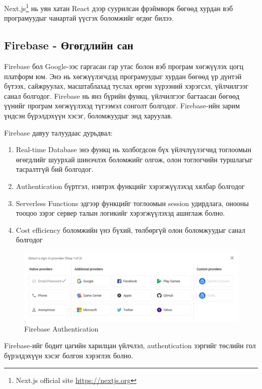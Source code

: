 Next.js\footnote{Next.js official site \url{https://nextjs.org}} нь уян хатан React дээр суурилсан фрэймворк бөгөөд хурдан вэб програмуудыг чанартай үүсгэх боломжийг өгдөг билээ. 


\subsection{Firebase - Өгөгдлийн сан}

Firebase бол Google-ээс гаргасан гар утас болон вэб програм хөгжүүлэх цогц платформ юм. Энэ нь хөгжүүлэгчдэд програмуудыг хурдан бөгөөд үр дүнтэй бүтээх, сайжруулах, масштаблахад туслах өргөн хүрээний хэрэгсэл, үйлчилгээг санал болгодог. Firebase нь янз бүрийн функц, үйлчилгээг багтаасан бөгөөд үүнийг програм хөгжүүлэхэд түгээмэл сонголт болгодог. Firebase-ийн зарим үндсэн бүрэлдэхүүн хэсэг, боломжуудыг энд харуулав.


Firebase давуу талуудаас дурьдвал:
\begin{enumerate}
	\item Real-time Database энэ функц нь холбогдсон бүх үйлчлүүлэгчид тоглоомын өгөгдлийг шуурхай шинэчлэх боломжийг олгож, олон тоглогчийн туршлагыг тасралтгүй бий болгодог.
	\item Authentication бүртгэл, нэвтрэх функцийг хэрэгжүүлэхэд хялбар болгодог
	\item Serverless Functions эдгээр функцийг тоглоомын session удирдлага, онооны тооцоо зэрэг сервер талын логикийг хэрэгжүүлэхэд ашиглаж болно.
	\item Cost efficiency боломжийн үнэ бүхий, төлбөргүй олон боломжуудыг санал болгодог
\end{enumerate}

\begin{figure}[h]
	\centering
	\includegraphics[width=15cm]{images/firebase_auth.png}
	\caption{Firebase Authentication}
	\label{fig:prisma}
\end{figure}

Firebase-ийг бодит цагийн харилцан үйлчлэл, authentication зэргийг төслийн гол бүрэлдэхүүн хэсэг болгон хэрэглэх болно.